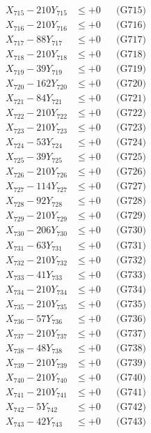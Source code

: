 \documentclass[a4paper,10pt]{article}
\begin{document}
{\begin{align}
X_{715} - 210Y_{715} &\leq +0 && \text{(G715)} \\
X_{716} - 210Y_{716} &\leq +0 && \text{(G716)} \\
X_{717} - 88Y_{717} &\leq +0 && \text{(G717)} \\
X_{718} - 210Y_{718} &\leq +0 && \text{(G718)} \\
X_{719} - 39Y_{719} &\leq +0 && \text{(G719)} \\
X_{720} - 162Y_{720} &\leq +0 && \text{(G720)} \\
\allowbreak
X_{721} - 84Y_{721} &\leq +0 && \text{(G721)} \\
X_{722} - 210Y_{722} &\leq +0 && \text{(G722)} \\
X_{723} - 210Y_{723} &\leq +0 && \text{(G723)} \\
X_{724} - 53Y_{724} &\leq +0 && \text{(G724)} \\
X_{725} - 39Y_{725} &\leq +0 && \text{(G725)} \\
X_{726} - 210Y_{726} &\leq +0 && \text{(G726)} \\
X_{727} - 114Y_{727} &\leq +0 && \text{(G727)} \\
X_{728} - 92Y_{728} &\leq +0 && \text{(G728)} \\
X_{729} - 210Y_{729} &\leq +0 && \text{(G729)} \\
X_{730} - 206Y_{730} &\leq +0 && \text{(G730)} \\
\allowbreak
X_{731} - 63Y_{731} &\leq +0 && \text{(G731)} \\
X_{732} - 210Y_{732} &\leq +0 && \text{(G732)} \\
X_{733} - 41Y_{733} &\leq +0 && \text{(G733)} \\
X_{734} - 210Y_{734} &\leq +0 && \text{(G734)} \\
X_{735} - 210Y_{735} &\leq +0 && \text{(G735)} \\
X_{736} - 57Y_{736} &\leq +0 && \text{(G736)} \\
X_{737} - 210Y_{737} &\leq +0 && \text{(G737)} \\
X_{738} - 48Y_{738} &\leq +0 && \text{(G738)} \\
X_{739} - 210Y_{739} &\leq +0 && \text{(G739)} \\
X_{740} - 210Y_{740} &\leq +0 && \text{(G740)} \\
\allowbreak
X_{741} - 210Y_{741} &\leq +0 && \text{(G741)} \\
X_{742} - 5Y_{742} &\leq +0 && \text{(G742)} \\
X_{743} - 42Y_{743} &\leq +0 && \text{(G743)} \\

\end{align}}
\end{document}
